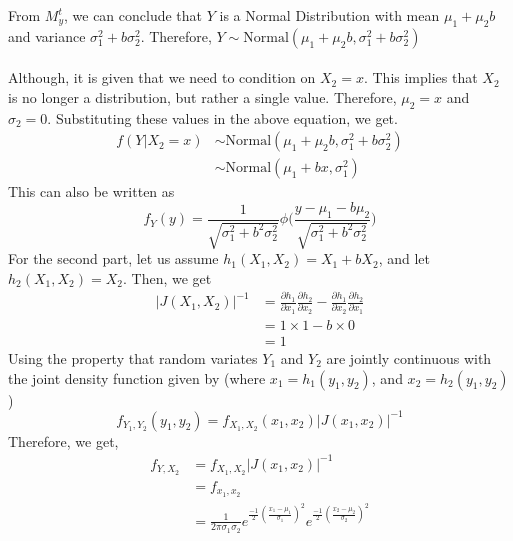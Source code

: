 \documentclass[11pt]{article}
\begin{document}
From $M_{y}^{t}$, we can conclude that $Y$ is a Normal Distribution with mean $\mu_{1} + \mu_{2}b$ and variance $\sigma_{1}^{2} + b\sigma_{2}^{2}$. Therefore, $Y \sim \text{Normal}(\mu_{1} + \mu_{2}b, \sigma_{1}^{2} + b\sigma_{2}^{2})$  \\ \\
Although, it is given that we need to condition on $X_{2} = x$. This implies that $X_{2}$ is no longer a distribution, but rather a single value. Therefore, $\mu_{2} = x$ and $\sigma_{2} = 0$. Substituting these values in the above equation, we get.
\begin{equation}
  \nonumber
  \begin{aligned}
    f(Y | X_{2} = x) & \sim \text{Normal}(\mu_{1} + \mu_{2}b, \sigma_{1}^{2} + b\sigma_{2}^{2})\\
    & \sim \text{Normal}(\mu_{1} + bx, \sigma_{1}^{2})
  \end{aligned}
\end{equation}
This can also be written as
\begin{equation}
  \nonumber
  f_{Y}(y) = \frac{1}{\sqrt{\sigma_{1}^2 + b^2 \sigma_{2}^{2}}} \phi\bigg(\frac{y - \mu_{1} - b\mu_{2}}{\sqrt{\sigma_{1}^{2} + b^{2}\sigma_{2}^{2}}}\bigg)
\end{equation}
For the second part, let us assume $h_{1}(X_{1}, X_{2}) = X_{1} + bX_{2}$, and let $h_{2}(X_{1}, X_{2}) = X_{2}$. Then, we get
\begin{equation}
  \nonumber
  \begin{aligned}
    \lvert J(X_{1}, X_{2}) \rvert^{-1} & = \frac{\partial h_{1}}{\partial x_{1}} \frac{\partial h_{2}}{\partial x_{2}} - \frac{\partial h_{1}}{\partial x_{2}} \frac{\partial h_{2}}{\partial x_{1}}\\
    & = 1 \times 1 - b \times 0\\
    & = 1
  \end{aligned}
\end{equation}
Using the property that random variates $Y_{1}$ and $Y_{2}$ are jointly continuous with the joint density function given by (where $x_{1} = h_{1}(y_{1}, y_{2})$, and $x_{2} = h_{2}(y_{1}, y_{2})$)
\begin{equation}
  \nonumber
  f_{Y_{1}, Y_{2}}(y_{1}, y_{2}) = f_{X_{1}, X_{2}}(x_{1}, x_{2}) \lvert J(x_{1}, x_{2}) \rvert^{-1}
\end{equation}
Therefore, we get,
\begin{equation}
  \nonumber
  \begin{aligned}
    f_{Y, X_{2}} & = f_{X_{1}, X_{2}} \lvert J(x_{1}, x_{2}) \rvert^{-1} \\
    & = f_{x_{1}, x_{2}}\\
    & = \frac{1}{2\pi \sigma_{1} \sigma_{2}}e^{\frac{-1}{2}(\frac{x_{1} - \mu_{1}}{\sigma_{1}})^{2}}e^{\frac{-1}{2}(\frac{x_{2} - \mu_{2}}{\sigma_{2}})^{2}}
  \end{aligned}
\end{equation}
\end{document}
